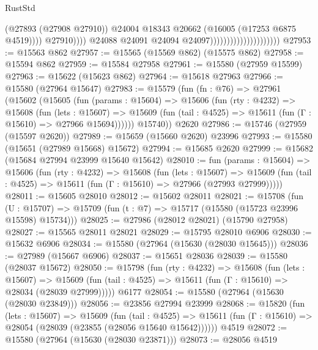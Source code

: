 \begin{lexlean}{RustStd}
\begin{coremodule}
                                                          (@27893 (@27908 @27910))
                                                          @24004
                                                          @18343
                                                          @20662
                                                          (@16005 (@17253 @6875 @4519))))
                                                      @27910))))
                                              @24088
                                              @24091
                                              @24094
                                              @24097)))))))))))))))))))))
@27953 := @15563 @862
@27957 := @15565 (@15569 @862) (@15575 @862)
@27958 := @15594 @862
@27959 := @15584 @27958
@27961 := @15580 (@27959 @15599)
@27963 := @15622 (@15623 @862)
@27964 := @15618 @27963
@27966 := @15580 (@27964 @15647)
@27983 := @15579
    (fun (fn : @76) =>
    @27961
      (@15602
        (@15605
          (fun (params : @15604) =>
          @15606
            (fun (rty : @4232) =>
            @15608
              (fun (lets : @15607) =>
              @15609 (fun (tail : @4525) => @15611 (fun (Γ : @15610) => @27966 @15694))))))
        @15740))
    @2620
@27986 := @15746 (@27959 (@15597 @2620))
@27989 := @15659 (@15660 @2620) @23996
@27993 := @15580 (@15651 (@27989 @15668) @15672)
@27994 := @15685 @2620
@27999 := @15682 (@15684 @27994 @23999 @15640 @15642)
@28010 := fun (params : @15604) =>
  @15606
    (fun (rty : @4232) =>
    @15608
      (fun (lets : @15607) =>
      @15609 (fun (tail : @4525) => @15611 (fun (Γ : @15610) => @27966 (@27993 @27999)))))
@28011 := @15605 @28010
@28012 := @15602 @28011
@28021 := @15708
    (fun (U : @15707) => @15709 (fun (t : @7) => @15717 (@15580 (@15723 @23996 @15598) @15734)))
@28025 := @27986 (@28012 @28021) (@15790 @27958)
@28027 := @15565 @28011 @28021
@28029 := @15795 @28010 @6906
@28030 := @15632 @6906
@28034 := @15580 (@27964 (@15630 (@28030 @15645)))
@28036 := @27989 (@15667 @6906)
@28037 := @15651 @28036
@28039 := @15580 (@28037 @15672)
@28050 := @15798
    (fun (rty : @4232) =>
    @15608
      (fun (lets : @15607) =>
      @15609 (fun (tail : @4525) => @15611 (fun (Γ : @15610) => @28034 (@28039 @27999)))))
    @6177
@28054 := @15580 (@27964 (@15630 (@28030 @23849)))
@28056 := @23856 @27994 @23999
@28068 := @15820
    (fun (lets : @15607) =>
    @15609
      (fun (tail : @4525) =>
      @15611 (fun (Γ : @15610) => @28054 (@28039 (@23855 (@28056 @15640 @15642))))))
    @4519
@28072 := @15580 (@27964 (@15630 (@28030 @23871)))
@28073 := @28056 @4519

\end{coremodule}
\end{lexlean}
